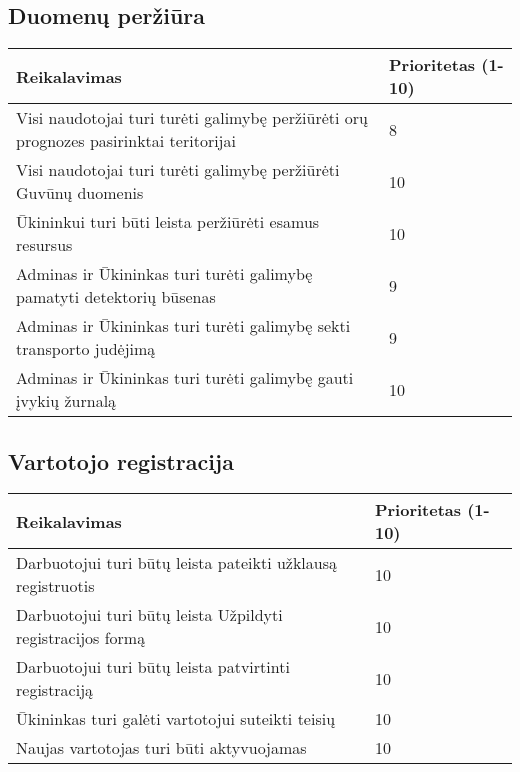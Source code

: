 \documentclass[oneside]{VUMIFPSkursinis}
\begin{document}
\subsection{Duomenų peržiūra}

\begin{table}[htbp]
	\begin{tabularx}{1\textwidth}{ |X|P{3cm }| }
       	           \hline
       	            Reikalavimas &  Prioritetas (1-10)  \\   \hline 
        		 Visi naudotojai turi turėti galimybę peržiūrėti orų prognozes pasirinktai teritorijai & 8 \\ \hline
        		 Visi naudotojai turi turėti galimybę peržiūrėti Guvūnų duomenis & 10 \\ \hline
        		 Ūkininkui turi būti leista peržiūrėti  esamus resursus & 10 \\ \hline
        		 Adminas ir Ūkininkas turi turėti galimybę pamatyti detektorių būsenas & 9 \\ \hline
        		 Adminas ir Ūkininkas turi turėti galimybę sekti transporto judėjimą & 9 \\ \hline
        		 Adminas ir Ūkininkas turi turėti galimybę gauti įvykių žurnalą & 10 \\ \hline
	\end{tabularx}
\end{table}

\subsection{Vartotojo registracija}

\begin{table}[htbp]
	\begin{tabularx}{1\textwidth}{ |X|P{3cm }| }
       	          \hline
           	Reikalavimas &  Prioritetas (1-10)  \\   \hline 
        		Darbuotojui turi būtų leista pateikti užklausą registruotis  &  10  \\   \hline
         		Darbuotojui turi būtų leista Užpildyti registracijos formą  &  10  \\   \hline
        		Darbuotojui turi būtų leista patvirtinti registraciją  & 10  \\   \hline
        		Ūkininkas turi galėti vartotojui suteikti teisių & 10 \\ \hline
        		Naujas vartotojas turi būti aktyvuojamas & 10 \\ \hline
	\end{tabularx}
\end{table}
\end{document}
